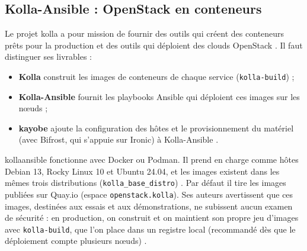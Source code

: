 \subsection{Kolla-Ansible : OpenStack en conteneurs}\label{sec:dep-kolla}

Le projet \gls{kolla} a pour mission de fournir des outils qui créent des conteneurs prêts pour la production et des outils qui déploient
des clouds OpenStack \parencite{kolla-source}. Il faut distinguer ses livrables :

\begin{itemize}
  \item \textbf{Kolla} construit les images de conteneurs de chaque service (\texttt{kolla-build}) ;
  \item \textbf{Kolla-Ansible} fournit les playbooks Ansible qui déploient ces images sur les nœuds ;
  \item \textbf{\gls{kayobe}} ajoute la configuration des hôtes et le provisionnement du matériel (avec Bifrost, qui s'appuie sur
        Ironic) à Kolla-Ansible \parencite{kayobe-index}.
\end{itemize}

\gls{kollaansible} fonctionne avec Docker ou Podman. Il prend en charge comme hôtes Debian 13, Rocky Linux 10 et Ubuntu 24.04, et les
images existent dans les mêmes trois distributions (\texttt{kolla\_base\_distro}) \parencite{kolla-ansible-support}. Par défaut il
tire les images publiées sur Quay.io (espace \texttt{openstack.kolla}). Ses auteurs avertissent que ces images, destinées aux
essais et aux démonstrations, ne subissent aucun examen de sécurité : en production, on construit et on maintient son propre jeu
d'images avec \texttt{kolla-build}, que l'on place dans un \gls{registre} local (recommandé dès que le déploiement compte plusieurs nœuds)
\parencite{kolla-source,kolla-image-building,kolla-ansible-multinode}.

